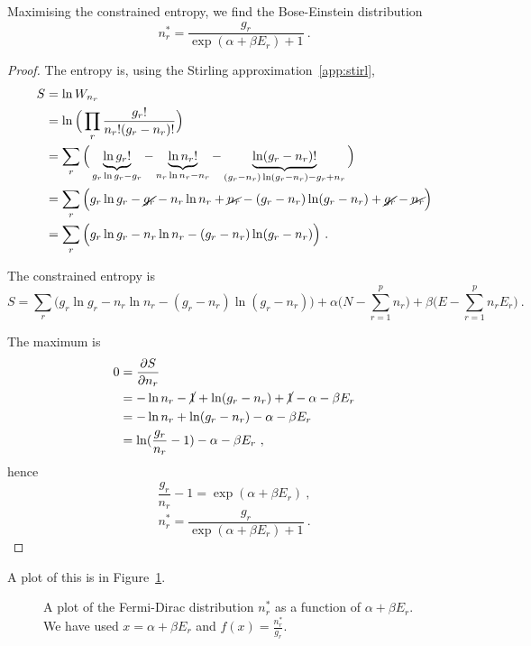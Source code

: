     Maximising the constrained entropy, we find the Bose-Einstein distribution 
    \begin{equation*}
        n_r^* = \frac{g_r}{\exp(\alpha + \beta E_r) + 1} ~.
    \end{equation*}
    \begin{proof}
        The entropy is, using the Stirling approximation~\eqref{app:stirl},
        \begin{equation*}
        \begin{aligned}
            S & = \ln W_{n_r} \\ & = \ln \Big (\prod_r \frac{g_r!}{n_r! (g_r - n_r)!} \Big) \\ & = \sum_r \Big ( \underbrace{\ln g_r!}_{g_r \ln g_r - g_r} - \underbrace{\ln n_r!}_{n_r \ln n_r - n_r} - \underbrace{\ln (g_r - n_r)!}_{(g_r - n_r) \ln (g_r - n_r) - g_r + n_r} \Big) \\ & = \sum_r \Big ( g_r \ln g_r - \cancel{g_r} - n_r \ln n_r + \cancel{n_r} - (g_r - n_r) \ln (g_r - n_r) + \cancel{g_r} - \cancel{n_r} \Big) \\ & = \sum_r \Big ( g_r \ln g_r - n_r \ln n_r - (g_r - n_r) \ln (g_r - n_r) \Big) 
             ~.
        \end{aligned}
        \end{equation*}
    
        The constrained entropy is
        \begin{equation*}
            S =  \sum_r \Big ( g_r \ln g_r - n_r \ln n_r - (g_r - n_r) \ln (g_r - n_r) \Big) + \alpha \Big (N - \sum_{r=1}^p n_r \Big) + \beta \Big (E - \sum_{r=1}^p n_r E_r \Big ) ~.
        \end{equation*}
    
        The maximum is 
        \begin{equation*}
        \begin{aligned}
            0 & = \frac{\partial S}{\partial n_r} \\ & = - \ln n_r - \cancel{1} + \ln (g_r - n_r) + \cancel{1} - \alpha - \beta E_r \\ & = - \ln n_r + \ln (g_r - n_r) - \alpha - \beta E_r \\ & = \ln (\frac{g_r}{n_r} - 1) - \alpha - \beta E_r~ ,
        \end{aligned}
        \end{equation*}
        hence 
        \begin{equation*}
            \frac{g_r}{n_r} - 1 = \exp(\alpha + \beta E_r) ~,
        \end{equation*}
        \begin{equation*}
            n_r^* = \frac{g_r}{\exp(\alpha + \beta E_r) + 1} ~.
        \end{equation*}
    \end{proof}
    A plot of this is in Figure~\ref{en:fd}.
    \begin{figure}
        \centering
        \caption{A plot of the Fermi-Dirac distribution $n_r^*$ as a function of $\alpha + \beta E_r$. We have used $x = \alpha + \beta E_r $ and $f(x) = \frac{n_r^*}{g_r}$.}
        \label{en:fd}
    \end{figure}

